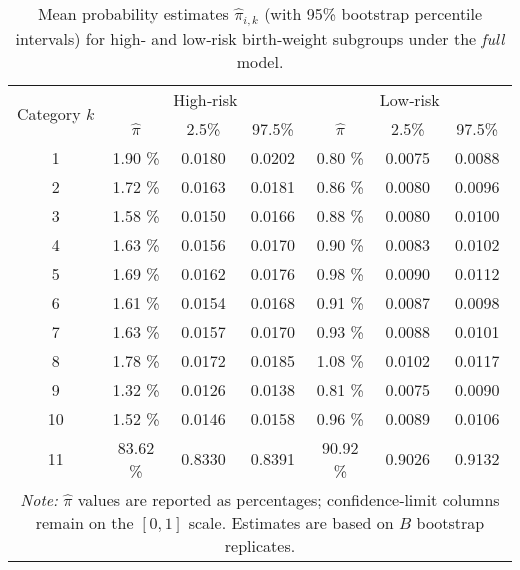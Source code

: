 \begin{table}[htbp]
\centering
\caption{Mean probability estimates $\hat{\pi}_{i,k}$ (with 95\% bootstrap percentile intervals) for high‑ and low‑risk birth‑weight subgroups under the \emph{full} model.}
\label{tab:pi_mean_full}
\begin{tabular}{ccccccc}
\toprule
\multirow{2}{*}{Category $k$} & \multicolumn{3}{c}{High‑risk} & \multicolumn{3}{c}{Low‑risk} \\
\cmidrule(lr){2-4}\cmidrule(lr){5-7}
 & $\hat{\pi}$ & 2.5\% & 97.5\% & $\hat{\pi}$ & 2.5\% & 97.5\% \\
\midrule
1  & 1.90 \% & 0.0180 & 0.0202 & 0.80 \% & 0.0075 & 0.0088 \\
2  & 1.72 \% & 0.0163 & 0.0181 & 0.86 \% & 0.0080 & 0.0096 \\
3  & 1.58 \% & 0.0150 & 0.0166 & 0.88 \% & 0.0080 & 0.0100 \\
4  & 1.63 \% & 0.0156 & 0.0170 & 0.90 \% & 0.0083 & 0.0102 \\
5  & 1.69 \% & 0.0162 & 0.0176 & 0.98 \% & 0.0090 & 0.0112 \\
6  & 1.61 \% & 0.0154 & 0.0168 & 0.91 \% & 0.0087 & 0.0098 \\
7  & 1.63 \% & 0.0157 & 0.0170 & 0.93 \% & 0.0088 & 0.0101 \\
8  & 1.78 \% & 0.0172 & 0.0185 & 1.08 \% & 0.0102 & 0.0117 \\
9  & 1.32 \% & 0.0126 & 0.0138 & 0.81 \% & 0.0075 & 0.0090 \\
10 & 1.52 \% & 0.0146 & 0.0158 & 0.96 \% & 0.0089 & 0.0106 \\
11 & 83.62 \% & 0.8330 & 0.8391 & 90.92 \% & 0.9026 & 0.9132 \\
\bottomrule
\multicolumn{7}{p{0.9\textwidth}}{\textit{Note:} $\hat{\pi}$ values are reported as percentages; confidence‑limit columns remain on the \([0,1]\) scale.  Estimates are based on $B$ bootstrap replicates.}\\
\end{tabular}
\end{table}


